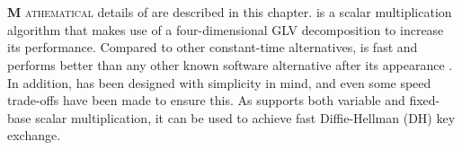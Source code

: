 \chapter{\texorpdfstring{\fourq}{FourQ}} \label{chp: FourQ}
\lettrine[lhang = 0.4, findent=-30pt, lines=4]{\textbf{
		\initfamily \fontsize{20mm}{20mm} \selectfont M
		\normalfont}}{athematical} 
details of {\fourq} are described in this chapter.
{\fourq} is a scalar multiplication algorithm that makes use of a four-dimensional GLV decomposition to increase its performance.
Compared to other constant-time alternatives, {\fourq} is fast and performs better than any other known software alternative after its appearance \cite{costello2015fourq}. 
In addition, {\fourq} has been designed with simplicity in mind, and even some speed trade-offs have been made to ensure this.
As {\fourq} supports both variable and fixed-base scalar multiplication, it can be used to achieve fast Diffie-Hellman (DH) key exchange.




